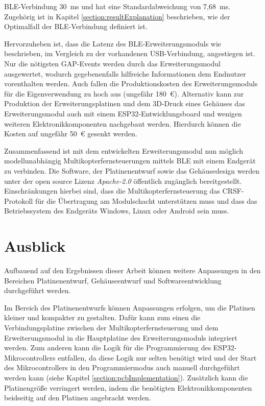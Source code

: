 \ac{BLE}-Verbindung 30~ms und hat eine Standardabweichung von 7,68~ms. Zugehörig ist in Kapitel \ref{section:resultExplanation} beschrieben, wie der Optimalfall der \ac{BLE}-Verbindung definiert ist.

Hervorzuheben ist, dass die Latenz des \ac{BLE}-Erweiterungsmoduls wie beschrieben, im Vergleich zu der vorhandenen \acs{USB}-Verbindung, angestiegen ist. Nur die nötigsten \ac{GAP}-Events werden durch das Erweiterungsmodul ausgewertet, wodurch gegebenenfalls hilfreiche Informationen dem Endnutzer vorenthalten werden. Auch fallen die Produktionskosten des Erweiterungsmoduls für die Eigenverwendung zu hoch aus (ungefähr 180~€). Alternativ kann zur Produktion der Erweiterungsplatinen und dem 3D-Druck eines Gehäuses das Erweiterungsmodul auch mit einem ESP32-Entwicklungsboard und wenigen weiteren Elektronikkomponenten nachgebaut werden. Hierdurch können die Kosten auf ungefähr 50~€ gesenkt werden. 

Zusammenfassend ist mit dem entwickelten Erweiterungsmodul nun möglich modellunabhängig Multikopterfernsteuerungen mittels \ac{BLE} mit einem Endgerät zu verbinden. Die Software, der Platinenentwurf sowie das Gehäusedesign werden unter der open source Lizenz \textit{Apache-2.0} öffentlich zugänglich bereitgestellt. Einschränkungen hierbei sind, dass die Multikopterfernsteuerung das CRSF-Protokoll für die Übertragung am Modulschacht unterstützen muss und dass das Betriebssystem des Endgeräts Windows, Linux oder Android sein muss.

\section{Ausblick}
Aufbauend auf den Ergebnissen dieser Arbeit können weitere Anpassungen in den Bereichen Platinenentwurf, Gehäuseentwurf und Softwareentwicklung durchgeführt werden.

Im Bereich des Platinenentwurfs können Anpassungen erfolgen, um die Platinen kleiner und kompakter zu gestalten. Dafür kann zum einen die Verbindungsplatine zwischen der Multikopterfernsteuerung und dem Erweiterungsmodul in die Hauptplatine des Erweiterungsmoduls integriert werden. Zum anderen kann die Logik für die Programmierung des ESP32-Mikrocontrollers entfallen, da diese Logik nur selten benötigt wird und der Start des Mikrocontrollers in den Programmiermodus auch manuell durchgeführt werden kann (siehe Kapitel \ref{section:pcbImplementation}). Zusätzlich kann die Platinengröße verringert werden, indem die benötigten Elektronikkomponenten beidseitig auf den Platinen angebracht werden.

